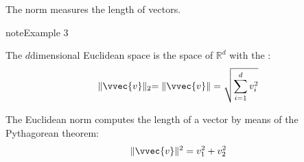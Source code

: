 \documentclass[letterpaper,10pt,english]{jupyterBook}
\begin{document}
\sphinxAtStartPar
The norm measures the length of vectors.
\label{linalg_normed_vs:example-1}
\begin{sphinxadmonition}{note}{Example 3}



\sphinxAtStartPar
The \(d\)\sphinxhyphen{}dimensional Euclidean space is the space of \(\mathbb{R}^d\) with the :
\begin{equation*}
\begin{split}\lVert \vvec{v}\lVert_2 = \lVert \vvec{v}\rVert =\sqrt{\sum_{i=1}^d v_i^2}\end{split}
\end{equation*}
\begin{center}\end{center}
\sphinxAtStartPar
The Euclidean norm computes the length of a vector by means of the Pythagorean theorem:
\begin{equation*}
\begin{split}\lVert \vvec{v}\rVert^2 = v_1^2 + v_2^2\end{split}
\end{equation*}
\end{sphinxadmonition}
\end{document}
